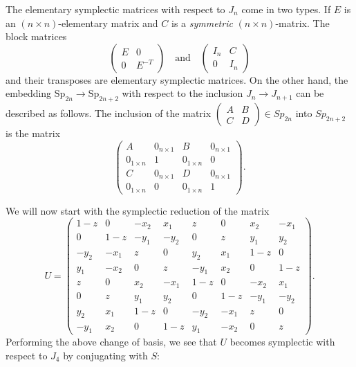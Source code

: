 \documentclass[11pt,leqno]{article}
\renewcommand{\1}{{\rm 1\hspace*{-0.4ex}%
\rule{0.1ex}{1.52ex}\hspace*{0.2ex}}}
\newcommand{\<}[1]{{\langle}#1 {\rangle}}
\theoremstyle{plain}
\theoremstyle{definition}
\theoremstyle{remark}
\numberwithin{equation}{section}
\begin{document}
The elementary symplectic matrices with respect to $J_n$ come in two types. If $E$ is an $(n\times n)$-elementary matrix and $C$ is a \emph{symmetric} $(n\times n)$-matrix. The block matrices 
\begin{equation*}
    \begin{pmatrix}
        E & 0 \\ 0 & E^{-T}
    \end{pmatrix} \quad \text{and} \quad \begin{pmatrix}
        I_n & C \\ 0  & I_n
    \end{pmatrix}
\end{equation*} 
and their transposes are elementary symplectic matrices. On the other hand, the embedding $\mathrm{Sp}_{2n}\to \mathrm{Sp}_{2n+2}$ with respect to the inclusion $J_n \to J_{n+1}$ can be described as follows. The inclusion of the matrix $\begin{pmatrix}
    A & B \\ C  & D
\end{pmatrix} \in Sp_{2n}$ into $Sp_{2n+2}$ is the matrix 
\begin{equation*}
    \begin{pmatrix}
    A & 0_{n \times 1} & B  & 0_{n \times 1} \\ 0_{1 \times n} & 1 & 0_{1 \times n} & 0 \\ C & 0_{n \times 1}  & D & 0_{n \times 1} \\ 0_{1 \times n} & 0 & 0_{1 \times n} & 1
\end{pmatrix}.
\end{equation*}

We will now start with the symplectic reduction of the matrix
\begin{equation*}
    U=\begin{pmatrix} 1-z & 0 & -x_2 & x_1 & z & 0 & x_2 & -x_1 \\0 & 1-z & -y_1 & -y_2 & 0 & z & y_1 & y_2 \\
-y_2 & -x_1 & z & 0 & y_2 & x_1 & 1-z & 0 \\ y_1 & -x_2 & 0 & z & -y_1 & x_2 & 0 & 1-z \\
z & 0 & x_2 & -x_1 & 1-z & 0 & -x_2 & x_1 \\0 & z & y_1 & y_2 & 0 & 1-z & -y_1 & -y_2 \\
y_2 & x_1 & 1-z & 0 & -y_2 & -x_1 & z & 0 \\ -y_1 & x_2 & 0 & 1-z & y_1 & -x_2 & 0 & z\end{pmatrix}.
\end{equation*}
Performing the above change of basis, we see that $U$ becomes symplectic with respect to $J_4$ by conjugating with $S$:
\end{document}
